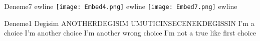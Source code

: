 \documentclass{exam}
\begin{document}
\begin{questions}
\question Deneme7
ewline
\texttt{[image: Embed4.png]} 
ewline
\texttt{[image: Embed7.png]} 
ewline
\begin{oneparchoices}
\choice Deneme1
\choice Degisim
\choice ANOTHERDEGISIM
\choice UMUTICINSECENEKDEGISSIN
\choice I'm a choice
\choice I'm another choice
\choice I'm another wrong choice
\choice I'm not a true like first choice
\end{oneparchoices}
\end{questions}
\end{document}
